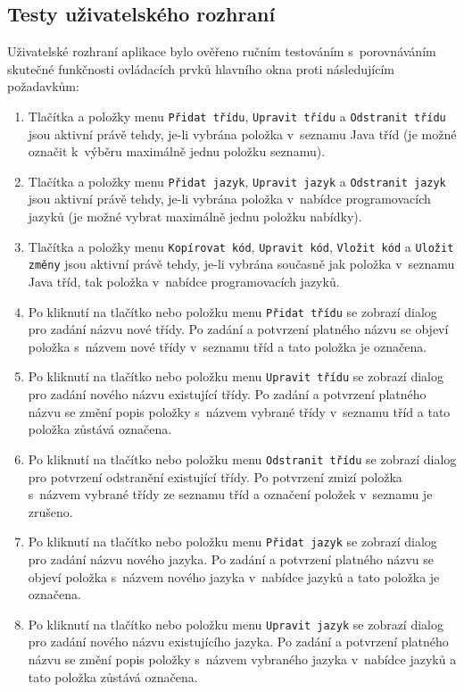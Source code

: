 \documentclass[czech,BP]{thesiskiv}
\begin{document}
\subsection{Testy uživatelského rozhraní}
Uživatelské rozhraní aplikace bylo ověřeno ručním testováním s~porovnáváním skutečné funkčnosti ovládacích prvků hlavního okna proti následujícím požadavkům:
\begin{enumerate}
\item{Tlačítka a položky menu \texttt{Přidat třídu}, \texttt{Upravit třídu} a \texttt{Odstranit třídu} jsou aktivní právě tehdy, je-li vybrána položka v~seznamu Java tříd (je možné označit k~výběru maximálně jednu položku seznamu).}
\item{Tlačítka a položky menu \texttt{Přidat jazyk}, \texttt{Upravit jazyk} a \texttt{Odstranit jazyk} jsou aktivní právě tehdy, je-li vybrána položka v~nabídce programovacích jazyků (je možné vybrat maximálně jednu položku nabídky).}
\item{Tlačítka a položky menu \texttt{Kopírovat kód}, \texttt{Upravit kód}, \texttt{Vložit kód} a \texttt{Uložit změny} jsou aktivní právě tehdy, je-li vybrána současně jak položka v~seznamu Java tříd, tak položka v~nabídce programovacích jazyků.}
\item{Po kliknutí na tlačítko nebo položku menu \texttt{Přidat třídu} se zobrazí dialog pro zadání názvu nové třídy. Po zadání a potvrzení platného názvu se objeví položka s~názvem nové třídy v~seznamu tříd a tato položka je označena.}
\item{Po kliknutí na tlačítko nebo položku menu \texttt{Upravit třídu} se zobrazí dialog pro zadání nového názvu existující třídy. Po zadání a potvrzení platného názvu se změní popis položky s~názvem vybrané třídy v~seznamu tříd a tato položka zůstává označena.}
\item{Po kliknutí na tlačítko nebo položku menu \texttt{Odstranit třídu} se zobrazí dialog pro potvrzení odstranění existující třídy. Po potvrzení zmizí položka s~názvem vybrané třídy ze seznamu tříd a označení položek v~seznamu je zrušeno.}
\item{Po kliknutí na tlačítko nebo položku menu \texttt{Přidat jazyk} se zobrazí dialog pro zadání názvu nového jazyka. Po zadání a potvrzení platného názvu se objeví položka s~názvem nového jazyka v~nabídce jazyků a tato položka je označena.}
\item{Po kliknutí na tlačítko nebo položku menu \texttt{Upravit jazyk} se zobrazí dialog pro zadání nového názvu existujícího jazyka. Po zadání a potvrzení platného názvu se změní popis položky s~názvem vybraného jazyka v~nabídce jazyků a tato položka zůstává označena.}

\end{enumerate}
\end{document}
